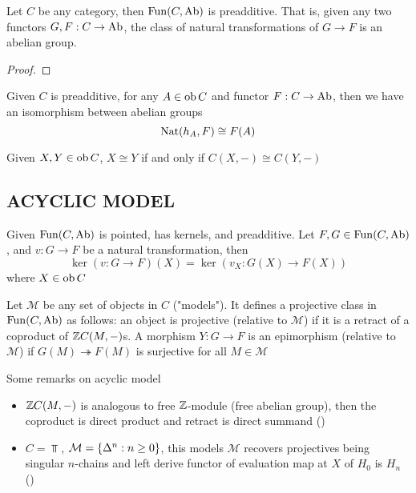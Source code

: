 \documentclass{report}
\begin{document}
\begin{lemma}
    Let $C$ be any category, then $\operatorname{Fun}(C, \operatorname{Ab})$ is preadditive. That is, given any two functors $G, F: C \to \operatorname{Ab}$, the class of natural transformations of $G \to F $ is an abelian group.
\end{lemma}

\begin{proof}
\end{proof}
 
\begin{proposition}
     Given $C$ is preadditive, for any $A \in \operatorname{ob} C$ and functor $F: C \to \operatorname{Ab}$, then we have an isomorphism between abelian groups
     $$
        \operatorname{Nat}(h_A, F) \cong F(A)
     $$
\end{proposition}

\begin{corollary}
    Given $X, Y \in \operatorname{ob} C$, $X \cong Y$ if and only if $C(X, -) \cong C(Y, -)$
\end{corollary}

\subsection{ACYCLIC MODEL}

\begin{remark}
    Given $\operatorname{Fun}(C, \operatorname{Ab})$ is pointed, has kernels, and preadditive. Let $F, G \in \operatorname{Fun}(C, \operatorname{Ab})$, and $v: G \to F$ be a natural transformation, then
    $$
        \ker (v: G \to F)(X) = \ker (v_X: G(X) \to F(X))
    $$
    where $X \in \operatorname{ob} C$
\end{remark}

\begin{definition}
    Let $\mathcal{M}$ be any set of objects in $C$ ("models"). It defines a projective class in $\operatorname{Fun}(C, \operatorname{Ab})$ as follows:  an object is projective (relative to $\mathcal{M}$) if it is a retract of a coproduct of $\mathbb{Z} C(M, -)$s. A morphism $Y: G \to F$ is an epimorphism (relative to $\mathcal{M}$) if $G(M) \twoheadrightarrow F(M)$ is surjective for all $M \in \mathcal{M}$
\end{definition}

\begin{remark}
    Some remarks on acyclic model
    \begin{itemize}
        \item $\mathbb{Z} C(M, -)$ is analogous to free $\mathbb{Z}$-module (free abelian group), then the coproduct is direct product and retract is direct summand ()
    
        \item $C = \Top$, $\mathcal{M} = \{\Delta^n: n \geq 0\}$, this models $\mathcal{M}$ recovers projectives being singular $n$-chains and left derive functor of evaluation map at $X$ of $H_0$ is $H_n$ ()
    \end{itemize}
\end{remark}
\end{document}
